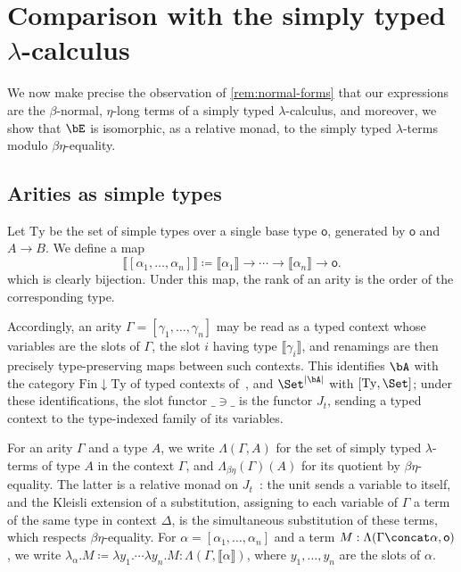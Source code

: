 \section{Comparison with the simply typed \texorpdfstring{$\lambda$}{lambda}-calculus}\label{sec:lambda}

We now make precise the observation of \cref{rem:normal-forms} that our expressions are the $\beta$-normal, $\eta$-long terms of a simply typed $\lambda$-calculus, and moreover, we show that $\bE$ is isomorphic, as a relative monad, to the simply typed $\lambda$-terms modulo $\beta\eta$-equality.

\subsection{Arities as simple types}

Let $\mathrm{Ty}$ be the set of simple types over a single base type $\mathsf{o}$, generated by $\mathsf{o}$ and $A \to B$. We define a map
\[
\llbracket [\alpha_1, \ldots, \alpha_n] \rrbracket \coloneqq \llbracket \alpha_1 \rrbracket \to \cdots \to \llbracket \alpha_n \rrbracket \to \mathsf{o}.
\]
which is clearly bijection. Under this map, the rank of an arity is the order of the corresponding type.

Accordingly, an arity $\Gamma = [\gamma_1, \ldots, \gamma_n]$ may be read as a typed context whose variables are the slots of $\Gamma$, the slot $i$ having type $\llbracket \gamma_i \rrbracket$, and renamings are then precisely type-preserving maps between such contexts. This identifies $\bA$ with the category $\mathrm{Fin} \downarrow \mathrm{Ty}$ of typed contexts of~\cite[Ex.~2.5]{AltenkirchChapmanUustalu2015}, and $\Set^{\left|\bA\right|}$ with $[\mathrm{Ty}, \Set]$; under these identifications, the slot functor $\_ \ni \_$ is the functor $J_t$, sending a typed context to the type-indexed family of its variables.

For an arity $\Gamma$ and a type $A$, we write $\Lambda(\Gamma, A)$ for the set of simply typed $\lambda$-terms of type $A$ in the context $\Gamma$, and $\Lambda_{\beta\eta}(\Gamma)(A)$ for its quotient by $\beta\eta$-equality. The latter is a relative monad on $J_t$~\cite[Ex.~2.5]{AltenkirchChapmanUustalu2015}: the unit sends a variable to itself, and the Kleisli extension of a substitution, assigning to each variable of $\Gamma$ a term of the same type in context $\Delta$, is the simultaneous substitution of these terms, which respects $\beta\eta$-equality. For $\alpha = [\alpha_1, \ldots, \alpha_n]$ and a term $M : \Lambda(\Gamma \concat \alpha, \mathsf{o})$, we write $\lambda_\alpha. M \coloneqq \lambda y_1. \cdots \lambda y_n. M : \Lambda(\Gamma, \llbracket \alpha \rrbracket)$, where $y_1, \ldots, y_n$ are the slots of $\alpha$.

